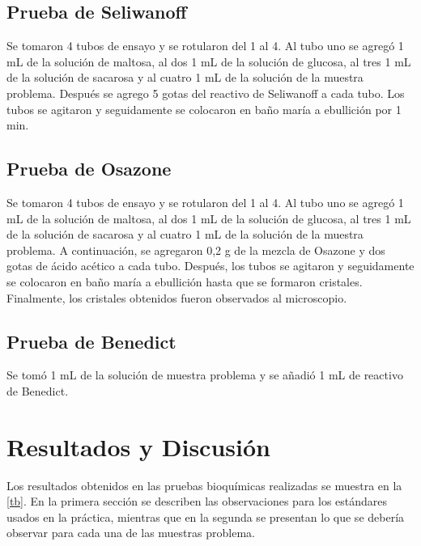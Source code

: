 \documentclass[fleqn,10pt]{SelfArx}
\begin{document}
	\subsection{Prueba de Seliwanoff}
	Se tomaron 4 tubos de ensayo y se rotularon del 1 al 4. Al tubo uno se agregó 1 mL de la solución de maltosa, al dos 1 mL de la solución de glucosa, al tres 1 mL de la solución de sacarosa y al cuatro 1 mL de la solución de la muestra problema. Después se agrego 5 gotas del reactivo de Seliwanoff a cada tubo. Los tubos se agitaron y seguidamente se colocaron en baño maría a ebullición por 1 min.
	
	\subsection{Prueba de Osazone} 
	Se tomaron 4 tubos de ensayo y se rotularon del 1 al 4. Al tubo uno se agregó 1 mL de la solución de maltosa, al dos 1 mL de la solución de glucosa, al tres 1 mL de la solución de sacarosa y al cuatro 1 mL de la solución de la muestra problema. A continuación, se agregaron 0,2 g de la mezcla de Osazone y dos gotas de \'acido acético a cada tubo. Después, los tubos se agitaron y seguidamente se colocaron en baño maría a ebullición hasta que se formaron cristales. Finalmente, los cristales obtenidos fueron observados al microscopio.
	
	\subsection{Prueba de Benedict} Se tom\'o 1 mL de la solución de muestra problema y se añadió 1 mL de reactivo de Benedict.
	
\section{Resultados y Discusi\'on}
	Los resultados obtenidos en las pruebas bioqu\'imicas realizadas se muestra en la \autoref{tb}. En la primera secci\'on se describen las observaciones para los est\'andares usados en la pr\'actica, mientras que en la segunda se presentan lo que se deber\'ia observar para cada una de las muestras problema.
	
\end{document}
